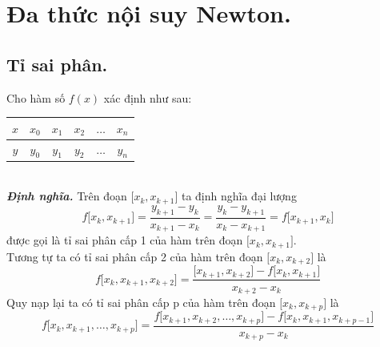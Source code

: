 \documentclass[12pt, a4paper]{report}
\def\DN{\textbf{\textit{Định nghĩa. }}}
\begin{document}
\section{Đa thức nội suy Newton.}
\subsection{Tỉ sai phân.}
Cho hàm số $f(x)$ xác định như sau:     \begin{tabular}{c|ccccc}
    $x$ & $x_0$ & $x_1$ & $x_2$ & $\ldots$ & $x_n$ \\ \hline
    $y$ & $y_0$ & $y_1$ & $y_2$ & $\ldots$ & $y_n$ 
    \end{tabular} \\   
\DN Trên đoạn $\lbrack x_k, x_{k+1} \rbrack$ ta định nghĩa đại lượng
\[
    f \lbrack x_k, x_{k+1} \rbrack = \frac{y_{k+1} - y_k}{x_{k+1} - x_k} = \frac{y_k - y_{k+1}}{x_k - x_{k+1}} = f\lbrack x_{k+1}, x_k \rbrack
\]
được gọi là tỉ sai phân cấp 1 của hàm trên đoạn $\lbrack x_k, x_{k+1} \rbrack$.\\
Tương tự ta có tỉ sai phân cấp 2 của hàm trên đoạn $\lbrack x_k, x_{k+2} \rbrack$ là 
\[
    f\lbrack x_k, x_{k+1},x_{k+2} \rbrack = \frac{\lbrack x_{k+1}, x_{k+2} \rbrack - f\lbrack x_k, x_{k+1} \rbrack}{x_{k+2} - x_k}
\]
Quy nạp lại ta có tỉ sai phân cấp p của hàm trên đoạn $\lbrack x_k, x_{k+p} \rbrack$ là 
\[
    f\lbrack x_k, x_{k+1},\ldots,x_{k+p} \rbrack = \frac{f\lbrack x_{k+1}, x_{k+2},\ldots,x_{k+p} \rbrack - f\lbrack x_k, x_{k+1},x_{k+p-1} \rbrack}{x_{k+p} - x_k} 
\]
\end{document}
